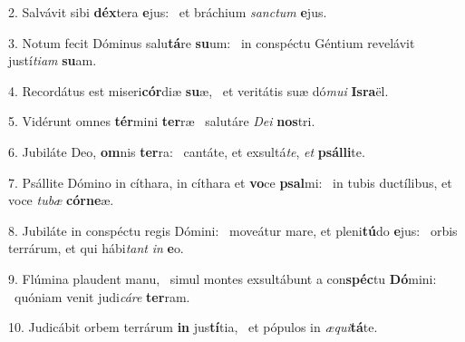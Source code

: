 2. Salvávit sibi \textbf{déx}tera \textbf{e}jus: \ast\  et bráchium \textit{sanc}\textit{tum} \textbf{e}jus.\

3. Notum fecit Dóminus salu\textbf{tá}re \textbf{su}um: \ast\  in conspéctu Géntium revelávit justí\textit{ti}\textit{am} \textbf{su}am.\

4. Recordátus est miseri\textbf{cór}diæ \textbf{su}æ, \ast\  et veritátis suæ dó\textit{mu}\textit{i} \textbf{Is}\textbf{ra}ël.\

5. Vidérunt omnes \textbf{tér}mini \textbf{ter}ræ \ast\  salutáre \textit{De}\textit{i} \textbf{nos}tri.\

6. Jubiláte Deo, \textbf{om}nis \textbf{ter}ra: \ast\  cantáte, et exsultá\textit{te}, \textit{et} \textbf{psál}\textbf{li}te.\

7. Psállite Dómino in cíthara, in cíthara et \textbf{vo}ce \textbf{psal}mi: \ast\  in tubis ductílibus, et voce \textit{tu}\textit{bæ} \textbf{cór}\textbf{ne}æ.\

8. Jubiláte in conspéctu regis Dómini: \dag\  moveátur mare, et pleni\textbf{tú}do \textbf{e}jus: \ast\  orbis terrárum, et qui hábi\textit{tant} \textit{in} \textbf{e}o.\

9. Flúmina plaudent manu, \dag\  simul montes exsultábunt a con\textbf{spéc}tu \textbf{Dó}mini: \ast\  quóniam venit judi\textit{cá}\textit{re} \textbf{ter}ram.\

10. Judicábit orbem terrárum \textbf{in} jus\textbf{tí}tia, \ast\  et pópulos in \textit{æ}\textit{qui}\textbf{tá}te.\

